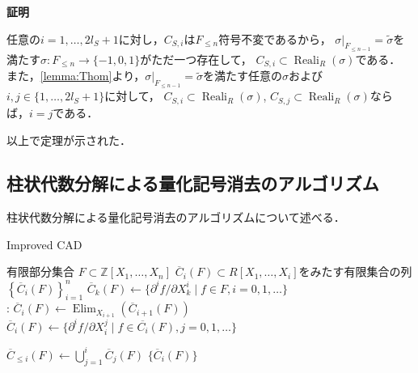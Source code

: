 \documentclass[uplatex, dvipdfmx]{jsarticle}
\makeatletter
\numberwithin{equation}{section}
\renewenvironment{proof}[1][\proofname]{\par
  \pushQED{\qed}%
  \normalfont \topsep6\p@\@plus6\p@\relax
  \trivlist
  \item\relax
  {\bfseries
  #1\@addpunct{.}}\hspace\labelsep\ignorespaces
}{
  \popQED\endtrivlist\@endpefalse
}
\newcommand{\Z}{\mathbb{Z}}
\newcommand{\map}[3]{{#1}\colon{#2}\rightarrow{#3}}
\DeclareMathOperator{\Elim}{Elim}
\DeclareMathOperator{\Reali}{Reali}
\theoremstyle{definition}
\renewcommand{\proofname}{\textbf{証明}}
\makeatother
\begin{document}
\begin{proof}
     任意の$i=1, \dots, 2l_S+1$に対し，$C_{S,i}$は$F_{\leq n}$符号不変であるから，
     $\sigma|_{F_{\leq n-1}} = \widetilde{\sigma}$を満たす$\map{\sigma}{F_{\leq n}}{\{-1,0,1\}}$がただ一つ存在して，
     $C_{S,i} \subset \Reali_R(\sigma)$である．
     また，\cref{lemma:Thom}より，$\sigma|_{F_{\leq n-1}} = \widetilde{\sigma}$を満たす任意の$\sigma$および
     $i,j \in \{1, \dots, 2l_S + 1\}$に対して，
     $C_{S,i} \subset \Reali_R(\sigma)$, $C_{S,j} \subset \Reali_R(\sigma)$ならば，$i=j$である．

     以上で定理が示された．
\end{proof}


\subsection{柱状代数分解による量化記号消去のアルゴリズム} 

柱状代数分解による量化記号消去のアルゴリズムについて述べる．




\begin{algorithm}
     \caption{Improved CAD}\label{Improved CAD}
     \begin{algorithmic}[1]
          \REQUIRE 
               有限部分集合
               $F \subset \Z[X_1, \dots, X_n]$
          \ENSURE
               $\overline{C}_i(F) \subset R[X_1, \dots, X_i]$をみたす有限集合の列$\left\{\overline{C}_i(F)\right\}_{i=1}^n$
          \STATE $\overline{C}_k(F)\leftarrow \{\partial^i f/ \partial X_k^i \mid f \in F, i=0,1,\dots \}$
          \\ :
               \STATE $\overline{C}_i(F) \leftarrow \Elim_{X_{i+1}}(\overline{C}_{i+1}(F))$
               \STATE $\overline{C}_i(F) \leftarrow \{ \partial^i f/ \partial X_i^j \mid f \in  \overline{C_i}(F), j=0,1, \dots\}$
          \ENDFOR

               \STATE $\overline{C}_{\leq i}(F) \leftarrow \bigcup_{j=1}^i \overline{C}_j(F)$
          \ENDFOR
          \RETURN $\{\overline{C}_i(F)\}$
     \end{algorithmic}
\end{algorithm}
\end{document}
